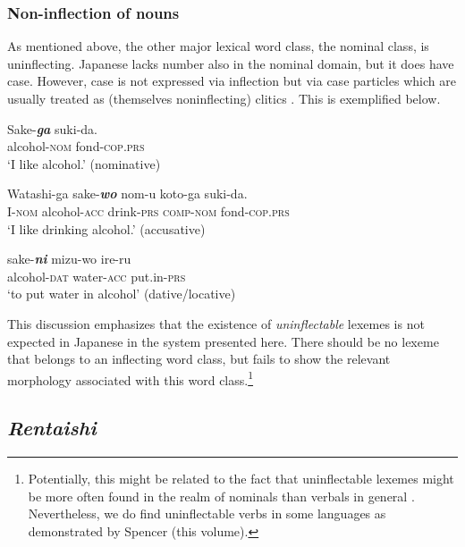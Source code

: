 \documentclass[output=paper,colorlinks,citecolor=brown]{langscibook}
\begin{document}
\subsubsection{Non-inflection of nouns} \label{12sec3.2.3}

As mentioned above, the other major lexical word class, the nominal class, is uninflecting. Japanese lacks number also in the nominal domain, but it does have case. However, case is not expressed via inflection but via case particles which are usually treated as (themselves noninflecting) clitics \citep{uehara1998, iwasaki2013}. This is exemplified below.

\begin{exe}
	\ex \label{12ex25}
	\gll Sake-\textbf{\emph{ga}} suki-da. \\
	alcohol-\textsc{nom} fond-\textsc{cop.prs} \\
	\trans ‘I like alcohol.’ \hfill (nominative)
	
	\ex \label{12ex26}
	\gll Watashi-ga sake-\textbf{\emph{wo}} nom-u koto-ga suki-da. \\
	I-\textsc{nom} alcohol-\textsc{acc} drink-\textsc{prs} \textsc{comp-nom} fond-\textsc{cop.prs} \\
	\trans ‘I like drinking alcohol.’ \hfill (accusative)
	
	\ex \label{12ex27}
	\gll sake-\textbf{\emph{ni}} mizu-wo ire-ru \\
	alcohol-\textsc{dat} water-\textsc{acc} put.in-\textsc{prs} \\
	\trans ‘to put water in alcohol’ \hfill (dative/locative)
\end{exe}

This discussion emphasizes that the existence of \emph{uninflectable} lexemes is not expected in Japanese in the system presented here. There should be no lexeme that belongs to an inflecting word class, but fails to show the relevant morphology associated with this word class.\footnote{Potentially, this might be related to the fact that uninflectable lexemes might be more often found in the realm of nominals than verbals in general \citep[143]{spencer2020}. Nevertheless, we do find uninflectable verbs in some languages as demonstrated by Spencer (this volume).}

\subsection{\emph{Rentaishi}} \label{12sec3.3}
\end{document}
